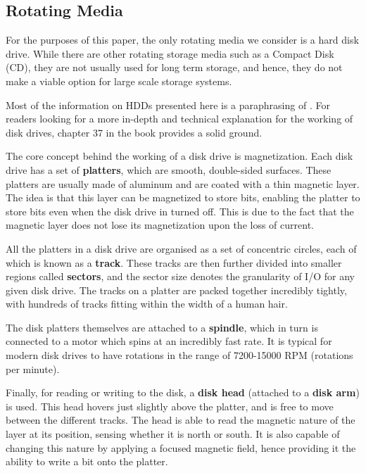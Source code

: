 \documentclass[10pt, author, twocolumn]{article}
\begin{document}
\subsection{Rotating Media}

For the purposes of this paper, the only rotating media we consider is a hard disk drive. While there are other rotating storage media such as a Compact Disk (CD), they are not usually used for long term storage, and hence, they do not make a viable option for large scale storage systems.

Most of the information on HDDs presented here is a paraphrasing of \cite{}. For readers looking for a more in-depth and technical explanation for the working of disk drives, chapter 37 in the book provides a solid ground. 

The core concept behind the working of a disk drive is magnetization. Each disk drive has a set of \textbf{platters}, which are smooth, double-sided surfaces. These platters are usually made of aluminum and are coated with a thin magnetic layer. The idea is that this layer can be magnetized to store bits, enabling the platter to store bits even when the disk drive in turned off. This is due to the fact that the magnetic layer does not lose its magnetization upon the loss of current. 

All the platters in a disk drive are organised as a set of concentric circles, each of which is known as a \textbf{track}. These tracks are then further divided into smaller regions called \textbf{sectors}, and the sector size denotes the granularity of I/O for any given disk drive. The tracks on a platter are packed together incredibly tightly, with hundreds of tracks fitting within the width of a human hair.

The disk platters themselves are attached to a \textbf{spindle}, which in turn is connected to a motor which spins at an incredibly fast rate. It is typical for modern disk drives to have rotations in the range of 7200-15000 RPM (rotations per minute). 

Finally, for reading or writing to the disk, a \textbf{disk head} (attached to a \textbf{disk arm}) is used. This head hovers just slightly above the platter, and is free to move between the different tracks. The head is able to read the magnetic nature of the layer at its position, sensing whether it is north or south. It is also capable of changing this nature by applying a focused magnetic field, hence providing it the ability to write a bit onto the platter.
\end{document}
